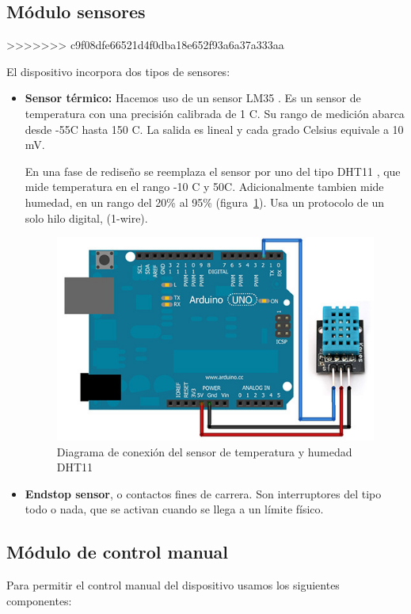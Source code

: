 \begin{itemize}
\subsection{Módulo sensores}
>>>>>>> c9f08dfe66521d4f0dba18e652f93a6a37a333aa

El dispositivo incorpora dos tipos de sensores:

\begin{itemize}
<<<<<<< HEAD
	\item \textbf{Sensor térmico:} Hacemos uso de un sensor LM35 \cite{LM35}. Es un sensor de temperatura con una precisión calibrada de 1 \grad C. Su rango de medición abarca desde -55\grad C hasta 150 \grad C. La salida es lineal y cada grado Celsius equivale a 10 mV.
	
	
	En una fase de rediseño se reemplaza el sensor por uno del tipo DHT11 \cite{dth11}, que mide temperatura en el rango -10 \grad C y 50\grad C. Adicionalmente tambien mide humedad, en un rango del 20\% al 95\% (figura~\ref{fig:dht11}). Usa un protocolo de un solo hilo digital, (1-wire). 
	
	
	\begin{figure}[h]
		\centering
		\includegraphics[width=0.5\linewidth]{../images/dht11}
		\caption[Diagrama sensor de temperatura y humedad DHT11]{Diagrama de conexión del sensor de temperatura y humedad DHT11}
		\label{fig:dht11}
	\end{figure}
	
	\item \textbf{Endstop sensor}, o contactos fines de carrera. Son interruptores del tipo todo o nada, que se activan cuando se llega a un límite físico. 
	
\end{itemize}


\subsection{Módulo de control manual}

Para permitir el control manual del dispositivo usamos los siguientes componentes:


\end{itemize}
